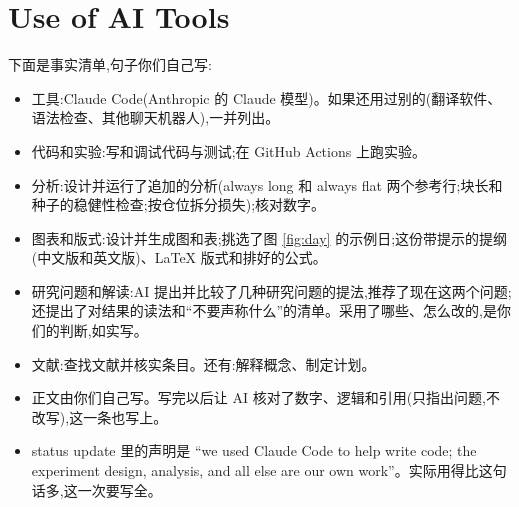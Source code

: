 \documentclass{article}
\newenvironment{pts}{\begin{itemize}[nosep,leftmargin=1.15em,topsep=1pt]}{\end{itemize}}
\begin{document}
\section*{Use of AI Tools}

\begin{note}
下面是事实清单,句子你们自己写:
\begin{pts}
\item 工具:Claude Code(Anthropic 的 Claude 模型)。如果还用过别的(翻译软件、语法检查、其他聊天机器人),一并列出。
\item 代码和实验:写和调试代码与测试;在 GitHub Actions 上跑实验。
\item 分析:设计并运行了追加的分析(always long 和 always flat 两个参考行;块长和种子的稳健性检查;按仓位拆分损失);核对数字。
\item 图表和版式:设计并生成图和表;挑选了图 \ref{fig:day} 的示例日;这份带提示的提纲(中文版和英文版)、LaTeX 版式和排好的公式。
\item 研究问题和解读:AI 提出并比较了几种研究问题的提法,推荐了现在这两个问题;还提出了对结果的读法和``不要声称什么''的清单。采用了哪些、怎么改的,是你们的判断,如实写。
\item 文献:查找文献并核实条目。还有:解释概念、制定计划。
\item 正文由你们自己写。写完以后让 AI 核对了数字、逻辑和引用(只指出问题,不改写),这一条也写上。
\item status update 里的声明是 ``we used Claude Code to help write code; the experiment design, analysis, and all else are our own work''。实际用得比这句话多,这一次要写全。
\end{pts}
\end{note}



\end{document}
